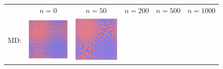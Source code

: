 \documentclass[12pt, reqno]{report}
\theoremstyle{definition}
\theoremstyle{remark}
\begin{document}
\def\subheight{.115\paperwidth}
\begin{figure}[H]

    \begin{tabular}{rccccc}

        ~ & $n=0$ & $n=50$ & $n=200$ & $n=500$ & $n=1000$ \\
        
        MD: &
        \includegraphics[align = c, height=\subheight]{media_paper/phase0.png} & 
        \includegraphics[align = c, height=\subheight]{media_paper/phase50.png} & 

\end{tabular}
\end{figure}
\end{document}

